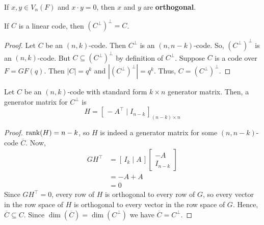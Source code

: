 
\begin{defbox}
    \begin{definition}
        If $ x,y\in V_n(F) $ and $ x\cdot y=0 $, then $ x $ and $ y $
        are \textbf{orthogonal}.
    \end{definition} \end{defbox}

\begin{thmbox}
    \begin{theorem}
        If $ C $ is a linear code, then $ (C^{\perp})^{\perp}=C $.
    \end{theorem} \end{thmbox}

\begin{proof}
    Let $ C $ be an $ (n,k) $-code. Then $ C^{\perp} $ is an $ (n,n-k) $-code.
    So, $ (C^{\perp})^{\perp} $ is an $ (n,k) $-code. But
    $ C\subseteq (C^{\perp})^{\perp} $ by definition of $ C^{\perp} $.
    Suppose $ C $ is a code over $ F=GF(q) $. Then $ |C|=q^k $
    and $ |(C^{\perp})^{\perp}|=q^k $. Thus, $ C=(C^{\perp})^{\perp} $.
\end{proof}

\begin{thmbox}
    \begin{theorem}
        Let $ C $ be an $ (n,k) $-code with standard form $ k\times n $ generator matrix.
        Then, a generator matrix for $ C^{\perp} $ is
        \[ H=\left[ \,-A^{\top}\mid I_{n-k}\, \right]_{(n-k)\times n} \]
    \end{theorem} \end{thmbox}

\begin{proof}
    $ \operatorname{rank}(H)=n-k $, so $ H $ is indeed a generator matrix for some $ (n,n-k) $-code
    $ \overline{C} $. Now,
    \begin{align*}
        GH^{\top}
         & =\left[ \,I_k\mid A\, \right]
        \begin{bmatrix}
            -A \\
            I_{n-k}
        \end{bmatrix}        \\
         & =-A+A                         \\
         & =0
    \end{align*}
    Since $ GH^{\top}=0 $, every row of $ H $ is orthogonal to every row of $ G $,
    so every vector in the row space of $ H $ is orthogonal to every vector in
    the row space of $ G $. Hence, $ \overline{C}\subseteq C $. Since
    $ \dim(\overline{C})=\dim(C^{\perp}) $ we have $ \overline{C}=C^{\perp} $.
\end{proof}

